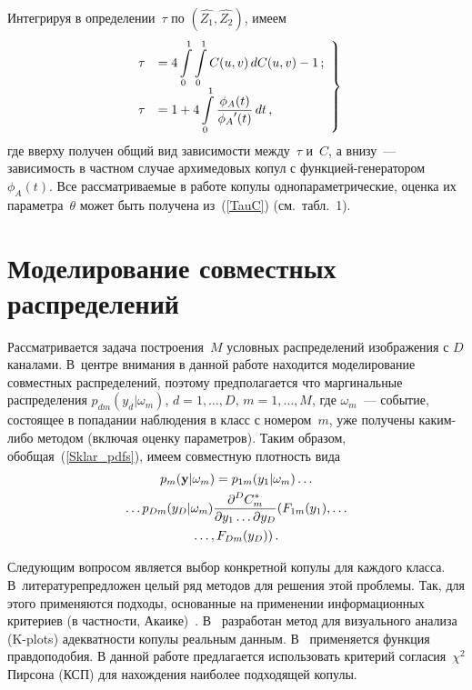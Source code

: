 \begin{multicols}{2}
Интегрируя в определении~$\tau$ по $(\hat{Z_1}, \hat{Z_2})$, имеем
\begin{equation}
\left.
\begin{array}{rl}
\tau &= 4\displaystyle\int\limits_0^1\int\limits_0^1 C(u,v)\,dC(u,v)-1\,;\\[9pt]
\tau &= 1 + 4\displaystyle\int\limits_0^1\displaystyle\frac{\displaystyle \phi_A(t)\mathstrut}{\displaystyle \phi_A{'}(t)\mathstrut}\,dt\,,
\end{array}
\right \}
\label{TauC}
\end{equation}
где вверху получен общий вид зависимости между~$\tau$ и~$C$, а внизу~--- 
зависимость в частном случае архимедовых копул с
функ\-ци\-ей-ге\-не\-ра\-то\-ром~$\phi_A(t)$. Все рассматриваемые в работе
копулы однопараметрические, оценка их параметра~$\theta$ может быть
получена из~(\ref{TauC}) (см.\ табл.~1).

\section{Моделирование совместных распределений}


Рассматривается задача построения~$M$ условных распределений
изображения с $D$ каналами. В~центре внимания в данной работе
находится моделирование совместных распределений, поэтому
предполагается что маргинальные распределения
$p_{dm}(y_d|\omega_m)$, $d=1,\ldots,D$, $m=1,\ldots,M$, где
$\omega_m$~--- событие, состоящее в попадании наблюдения в класс с
номером~$m$, уже получены каким-либо методом (включая оценку
параметров). Таким образом, обобщая~(\ref{Sklar_pdfs}), имеем
совместную плотность вида
\begin{multline}
p_m( {\bf y}|\omega_m) = p_{1m}( y_1|\omega_m)\ldots\\
\ldots p_{Dm}( y_D|\omega_m)
\displaystyle\frac{\displaystyle \partial^D C_m^*\mathstrut}{\displaystyle \partial y_1 \ldots \partial y_D\mathstrut}(F_{1m}(y_1),\ldots\\
\ldots , F_{Dm}(y_D))\,.
\label{Model3}
\end{multline}

Следующим вопросом является выбор конкретной копулы для каждого класса. 
В~литературе\linebreak предложен целый ряд методов для решения этой проблемы. Так, для этого
применяются подходы, основанные на применении информационных критериев (в частноcти, 
Акаике)~\cite{Nelsen}. В~\cite{Kplots}
разработан метод для визуального анализа (K-plots) адекват\-ности копулы реальным данным. 
В~\cite{Huard} применяется функция правдоподобия.
В данной работе предлагается использовать критерий согласия~$\chi^2$ Пирсона (КСП) для 
нахождения наиболее подходящей копулы.


\end{multicols}
